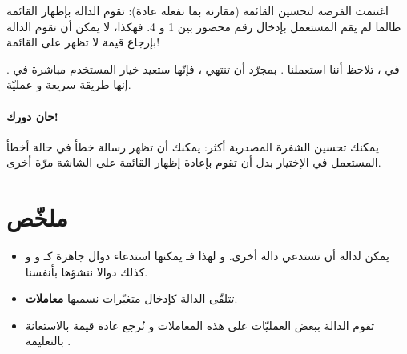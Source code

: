 اغتنمت الفرصة لتحسين القائمة (مقارنة بما نفعله عادة): تقوم الدالة 
بإظهار القائمة طالما لم يقم المستعمل بإدخال رقم محصور بين 1 و 4. فهكذا، لا يمكن أن تقوم الدالة بإرجاع قيمة لا تظهر على القائمة!

في ،
تلاحظ أننا استعملنا 
.
بمجرّد أن تنتهي
،
فإنّها ستعيد خيار المستخدم مباشرة في
.
إنها طريقة سريعة و عمليّة.

\paragraph{حان دورك!}
يمكنك تحسين الشفرة المصدرية أكثر: يمكنك أن تظهر رسالة خطأ في حالة أخطأ المستعمل في الإختيار بدل أن تقوم بإعادة إظهار القائمة على الشاشة مرّة أخرى.

\section*{ملخّص}

\begin{itemize}
	\item يمكن لدالة أن تستدعي دالة أخرى. و لهذا فـ
	يمكنها استدعاء دوال جاهزة كـ
	و 
	و كذلك دوالا ننشؤها بأنفسنا.
	\item تتلقّى الدالة كإدخال متغيّرات نسميها
	\textbf{معاملات}.
	\item تقوم الدالة ببعض العمليّات على هذه المعاملات و نُرجع عادة قيمة بالاستعانة بالتعليمة
	.
\end{itemize}

